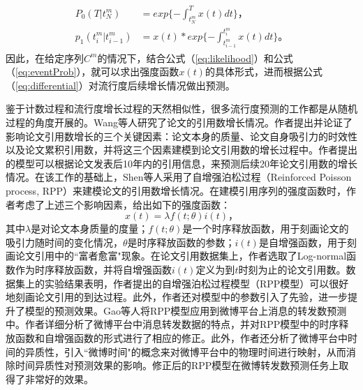\begin{eqnarray}
\label{eq:eventProb}
\begin{split}
P_0(T|t_N^m) & =exp\{-\int_{t_N^m}^T x(t)dt\}\text{，}\\
p_1(t_i^m|t_{i-1}^m) & =x(t)\ast exp\{-\int_{t_{i-1}^m}^{t_i^m} x(t)dt\}\text{。}
\end{split}
\end{eqnarray}
因此，在给定序列$C^m$的情况下，结合公式（\ref{eq:likelihood}）和公式（\ref{eq:eventProb}），就可以求出强度函数$x(t)$的具体形式，进而根据公式（\ref{eq:differential}）对流行度后续增长情况做出预测。

鉴于计数过程和流行度增长过程的天然相似性，很多流行度预测的工作都是从随机过程的角度开展的。Wang等人\citep{wang2013quantifying}研究了论文的引用数增长情况。作者提出并论证了影响论文引用数增长的三个关键因素：论文本身的质量、论文自身吸引力的时效性以及论文累积引用数，并将这三个因素建模到论文引用数的增长过程中。作者提出的模型可以根据论文发表后10年内的引用信息，来预测后续20年论文引用数的增长情况。在该工作的基础上，Shen等人\citep{shen2014modeling}采用了自增强泊松过程（Reinforced Poisson process, RPP）\citep{pemantle2007survey}来建模论文的引用数增长情况。在建模引用序列的强度函数时，作者考虑了上述三个影响因素，给出如下的强度函数：
\begin{equation}
\label{eq:intensityRPP}
x(t)=\lambda f(t;\theta)i(t)\text{，}
\end{equation}
其中$\lambda$是对论文本身质量的度量；$f(t;\theta)$是一个时序释放函数，用于刻画论文的吸引力随时间的变化情况，$\theta$是时序释放函数的参数；$i(t)$是自增强函数，用于刻画论文引用中的``富者愈富"现象。在论文引用数据集上，作者选取了Log-normal函数作为时序释放函数，并将自增强函数$i(t)$定义为到$t$时刻为止的论文引用数。数据集上的实验结果表明，作者提出的自增强泊松过程模型（RPP模型）可以很好地刻画论文引用的到达过程。此外，作者还对模型中的参数引入了先验，进一步提升了模型的预测效果。Gao等人\citep{gao2015modeling}将RPP模型应用到微博平台上消息的转发数预测中。作者详细分析了微博平台中消息转发数据的特点，并对RPP模型中的时序释放函数和自增强函数的形式进行了相应的修正。此外，作者还分析了微博平台中时间的异质性，引入``微博时间"的概念来对微博平台中的物理时间进行映射，从而消除时间异质性对预测效果的影响。修正后的RPP模型在微博转发数预测任务上取得了非常好的效果。

